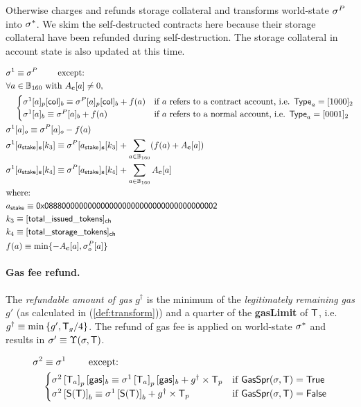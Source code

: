 Otherwise \name charges and refunds storage collateral and transforms world-state $\mathbf{\sigma}^P$ into $\mathbf{\sigma}^*$. 
We skim the self-destructed contracts here because their storage collateral have been refunded during self-destruction. 
The storage collateral in account state is also updated at this time. 

\begin{align}
	&\st^1  \eqdef \st^{P} \qquad \mbox{  except:}\\
	&\forall a \in \B_{160} \text{ with }  A_{\bf c}[a]\neq 0, \\
	&\quad \begin{cases}
	\st^1[a]_p[{\sf col}]_b \eqdef \st^{P}[a]_p[{\sf col}]_b + f(a) & \mbox{if $a$ refers to a contract account, i.e. $\mathsf{Type}_{a}=\typecontract$} \\
	\st^1[a]_b \eqdef \st^{P}[a]_b + f(a) & \mbox{if $a$ refers to a normal account, i.e. $\mathsf{Type}_{a}= \typenormal$}
	\end{cases}\\
	& \st^1[a]_o \eqdef \st^P[a]_o - f(a)\\ 
	&\st^1[a_{\sf stake}]_{\bf s}[k_3] \eqdef \st^P[a_{\sf stake}]_{\bf s}[k_3] + \sum_{a\in \B_{160}}(f(a) + A_{\bf c}[a]) \\
	&\st^1[a_{\sf stake}]_{\bf s}[k_4] \eqdef \st^P[a_{\sf stake}]_{\bf s}[k_4] + \sum_{a\in \B_{160}}A_{\bf c}[a] \\
	&\mbox{where:}  \\
	&a_{\sf stake} \eqdef \stakingcontract \\ 
	&k_3 \eqdef {\sf [total\char`_issued\char`_tokens]_{\sf ch}}  \\ 
	&k_4 \eqdef {\sf [total\char`_storage\char`_tokens]_{\sf ch}}  \\ 
	& f(a) \eqdef \min\{-A_{\bf c}[a], \st^P_o[a]\}
\end{align}


\paragraph{Gas fee refund.}

The \emph{refundable amount of gas} $g^{\dagger}$ is the minimum of the \emph{legitimately remaining gas} $g'$ (as calculated in (\ref{def:transform})) and a quarter of the \textbf{gasLimit} of $\textsf{T}$,
	i.e. $g^{\dagger}\equiv \min{\left \{{g', \textsf{T}_g/4} \right \}}$.
The refund of gas fee is applied on world-state $\mathbf{\sigma}^{*}$ and results in $\mathbf{\sigma}'\equiv \Upsilon(\mathbf{\sigma},\textsf{T})$.

\begin{align}
	& \mathbf{\sigma}^2  \equiv \mathbf{\sigma}^1 \qquad \mbox{  except:}\\
	& \quad \begin{cases} 
		\mathbf{\sigma}^2\left[\textsf{T}_a\right]_p[{\sf gas}]_b \equiv \mathbf{\sigma}^1\left[\textsf{T}_a\right]_p[{\sf gas}]_b+g^{\dagger}\times \textsf{T}_p 
		& \mbox{if $\mathsf{GasSpr}(\mathbf{\sigma},\textsf{T})=\mathsf{True}$}\\
		\mathbf{\sigma}^2 \left[\mathsf{S}{\left({\textsf{T}} \right)}\right]_b \equiv \mathbf{\sigma}^1\left[\mathsf{S}{\left({\textsf{T}} \right)}\right]_b + g^{\dagger}\times \textsf{T}_p 
		& \mbox{if $\mathsf{GasSpr}(\mathbf{\sigma},\textsf{T})=\mathsf{False}$}
	\end{cases} 
\end{align}

